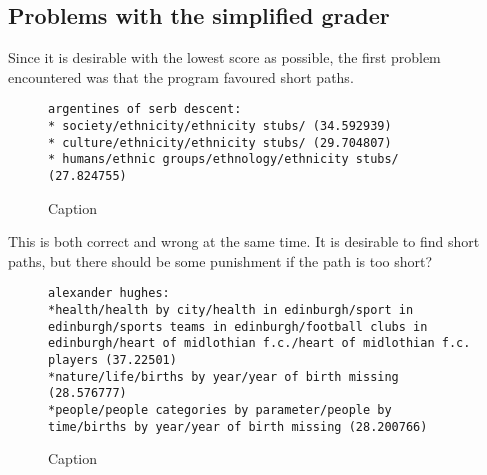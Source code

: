 \subsection{Problems with the simplified grader}
Since it is desirable with the lowest score as possible, the first problem encountered was that the program favoured short paths. 

\begin{figure}[h]
\centering
\begin{lstlisting}
argentines of serb descent:
* society/ethnicity/ethnicity stubs/ (34.592939)
* culture/ethnicity/ethnicity stubs/ (29.704807)
* humans/ethnic groups/ethnology/ethnicity stubs/ (27.824755)
\end{lstlisting}
\caption{Caption}
\label{fig:my_label}
\end{figure}

This is both correct and wrong at the same time. It is desirable to find short paths, but there should be some punishment if the path is too short?

\begin{comment}
Problem med Alexander Huges: han er fotballspiller og dette kommer ikke så godt fra. 

asd.,kas.kdfj
\end{comment}


\begin{figure}[h]
\centering
\begin{lstlisting}
alexander hughes:
*health/health by city/health in edinburgh/sport in edinburgh/sports teams in edinburgh/football clubs in edinburgh/heart of midlothian f.c./heart of midlothian f.c. players (37.22501)
*nature/life/births by year/year of birth missing (28.576777)
*people/people categories by parameter/people by time/births by year/year of birth missing (28.200766)
\end{lstlisting}

\caption{Caption}
\label{fig:alexanderhughes}
\end{figure}
